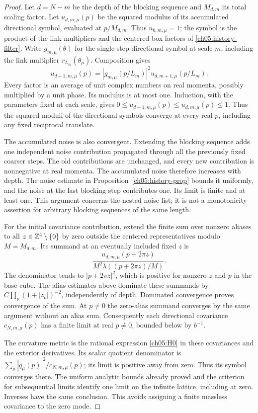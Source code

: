 \begin{proof}
Let $d=N-m$ be the depth of the blocking sequence and $M_{d,m}$ its total scaling factor.
Let $u_{d,m,\mu}(p)$ be the squared modulus of its accumulated directional
symbol, evaluated at $p/M_{d,m}$. Thus $u_{0,m,\mu}=1$; the symbol is the
product of the link multipliers and the centered-box factors of
\eqref{ch05:history-filter}. Write $g_{m,\mu}(\theta)$ for the
single-step directional symbol at scale $m$, including the link multiplier
$r_{L_m}(\theta_\mu)$. Composition gives
\[
 u_{d+1,m,\mu}(p)=|g_{m,\mu}(p/L_m)|^2
                         u_{d,m+1,\mu}(p/L_m).
\]
Every factor is an average of unit complex numbers on real momenta,
possibly multiplied by a unit phase. Its modulus is at most one.
Induction, with the parameters fixed at each scale, gives
$0\le u_{d+1,m,\mu}(p)\le u_{d,m,\mu}(p)\le1$.
Thus the squared moduli of the directional symbols converge at every real $p$, including
any fixed reciprocal translate.

The accumulated noise is also convergent. Extending the blocking sequence adds one
independent noise contribution propagated through all the previously
fixed coarser steps. The old contributions are unchanged, and every
new contribution is nonnegative at real momenta. The accumulated noise
therefore increases with depth. The noise estimate in
Proposition~\ref{ch05:history-prop} bounds it uniformly, and the noise
at the last blocking step contributes one. Its limit is finite and at
least one. This argument concerns the nested noise list; it is
not a monotonicity assertion for arbitrary blocking sequences of the same length.

For the initial covariance contribution, extend the finite sum over nonzero
aliases to all $z\in\mathbb Z^4\setminus\{0\}$ by zero outside the centered
representatives modulo $M=M_{d,m}$. Its summand at an eventually included
fixed $z$ is
\[
 \frac{u_{d,m,\mu}(p+2\pi z)}{M^2\lambda((p+2\pi z)/M)}.
\]
The denominator tends to $|p+2\pi z|^2$, which is positive for nonzero
$z$ and $p$ in the base cube. The alias estimates above dominate these
summands by $C\prod_\nu(1+|z_\nu|)^{-2}$, independently of depth.
Dominated convergence proves convergence of the sum. At $p\ne0$ the
zero-alias summand converges by the same argument without an alias sum.
Consequently each directional covariance $c_{N,m,\mu}(p)$ has a finite
limit at real $p\ne0$, bounded below by $b^{-1}$.

The curvature metric is the rational expression
\eqref{ch05:H0} in these covariances and the exterior derivatives. Its
scalar quotient denominator is
$\sum_\mu|q_\mu(p)|^2/c_{N,m,\mu}(p)$; its limit is positive away from
zero. Thus its symbol converges there. The uniform analytic bounds
already proved and the criterion for subsequential limits identify one limit on
the infinite lattice, including at zero. Inverses have the same conclusion.
This avoids assigning a finite massless covariance to the zero mode.


\end{proof}
